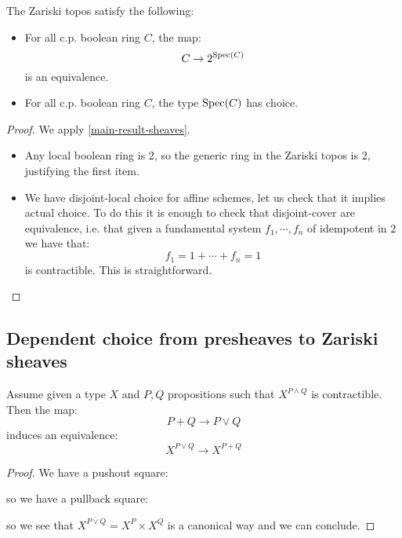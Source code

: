 \begin{proposition}
The Zariski topos satisfy the following:
\begin{itemize}
\item For all c.p. boolean ring $C$, the map:
\[C\to 2^{\operatorname{Spec}(C)}\]
is an equivalence.
\item For all c.p. boolean ring $C$, the type $\operatorname{Spec}(C)$ has choice.
\end{itemize}
\end{proposition}

\begin{proof}
We apply \cref{main-result-sheaves}. 
\begin{itemize}
\item Any local boolean ring is $2$, so the generic ring in the Zariski topos is $2$, justifying the first item.
\item We have disjoint-local choice for affine schemes, let us check that it implies actual choice. To do this it is enough to check that disjoint-cover are equivalence, i.e. that given a fundamental system $f_1,\cdots,f_n$ of idempotent in $2$ we have that:
\[f_1=1 + \cdots + f_n=1\]
is contractible. This is straightforward.
\end{itemize}
\end{proof}


\subsection{Dependent choice from presheaves to Zariski sheaves}

\begin{lemma}\label{join-zariski-equiv-binary}
Assume given a type $X$ and $P,Q$ propositions such that $X^{P\land Q}$ is contractible. Then the map:
\[P+Q \to P\lor Q\]
induces an equivalence:
\[X^{P\lor Q} \to X^{P+Q}\]
\end{lemma}

\begin{proof}
We have a pushout square:
\begin{center}
\end{center}
so we have a pullback square:
\begin{center}
\end{center}
so we see that $X^{P \lor Q} = X^P\times X^Q$ is a canonical way and we can conclude.
\end{proof}

